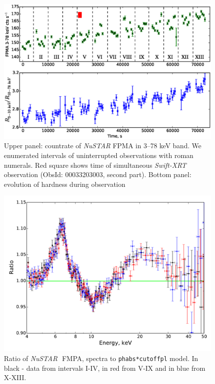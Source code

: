 \documentclass[a4paper,fleqn,usenatbib]{mnras}
\def\swiftx{{\em Swift-XRT\,}}
\def\nustar{{\em NuSTAR\,}}
\begin{document}
\begin{figure}
\centerline{\includegraphics[scale=0.7]{nuAlc_color_v04.eps}}
\caption{Upper panel: countrate of \nustar\,FPMA in 3--78 keV band. We enumerated intervals of uninterrupted observations with roman numerals. Red square shows time of simultaneous \swiftx observation (ObsId: 00033203003, second part). Bottom panel: evolution of hardness during observation} 
\label{fig:nust_lc}
\end{figure} 
 \begin{figure}
\centerline{\includegraphics[width=\linewidth]{ratios_v01.pdf}}
\caption{Ratio of \nustar\, FMPA, spectra to \texttt{phabs*cutoffpl} model. In black - data from intervals I-IV, in red from V-IX and in blue from X-XIII.} 
\label{fig:ratios}
\end{figure}  
\end{document}
